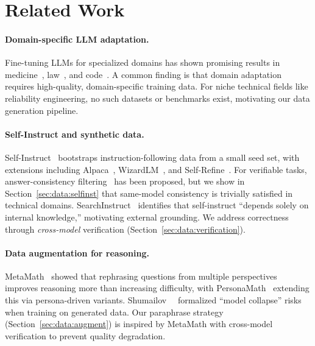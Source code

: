 \section{Related Work}
\label{sec:related}

\paragraph{Domain-specific LLM adaptation.}
Fine-tuning LLMs for specialized domains has shown promising results in medicine~\cite{singhal2023medpalm,wu2024pmcllama}, law~\cite{cui2023chatlaw}, and code~\cite{roziere2023codellama}. A common finding is that domain adaptation requires high-quality, domain-specific training data. For niche technical fields like reliability engineering, no such datasets or benchmarks exist, motivating our data generation pipeline.

\paragraph{Self-Instruct and synthetic data.}
Self-Instruct~\cite{wang2023selfinstruct} bootstraps instruction-following data from a small seed set, with extensions including Alpaca~\cite{taori2023alpaca}, WizardLM~\cite{xu2023wizardlm}, and Self-Refine~\cite{ranaldi2024selfrefine}. For verifiable tasks, answer-consistency filtering~\cite{wang2023selfinstruct} has been proposed, but we show in Section~\ref{sec:data:selfinst} that same-model consistency is trivially satisfied in technical domains. SearchInstruct~\cite{li2025searchinstruct} identifies that self-instruct ``depends solely on internal knowledge,'' motivating external grounding. We address correctness through \emph{cross-model} verification (Section~\ref{sec:data:verification}).

\paragraph{Data augmentation for reasoning.}
MetaMath~\cite{yu2024metamath} showed that rephrasing questions from multiple perspectives improves reasoning more than increasing difficulty, with PersonaMath~\cite{wang2024personamath} extending this via persona-driven variants. Shumailov~\etal~\cite{shumailov2024curse} formalized ``model collapse'' risks when training on generated data. Our paraphrase strategy (Section~\ref{sec:data:augment}) is inspired by MetaMath with cross-model verification to prevent quality degradation.

